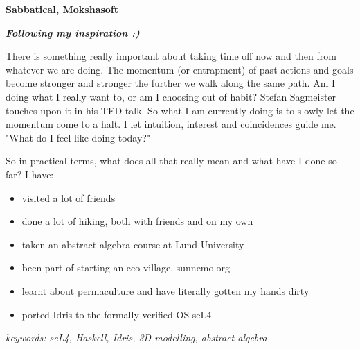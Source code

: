 \item[2016-] \textbf{Sabbatical, Mokshasoft}

\textit{\textbf{Following my inspiration :)}}

There is something really important about taking time off now and then from whatever we are doing. The momentum (or entrapment) of past actions and goals become stronger and stronger the further we walk along the same path. Am I doing what I really want to, or am I choosing out of habit? Stefan Sagmeister touches upon it in his TED talk. So what I am currently doing is to slowly let the momentum come to a halt. I let intuition, interest and coincidences guide me. "What do I feel like doing today?"

So in practical terms, what does all that really mean and what have I done so far? I have:

\begin{itemize}
    \item visited a lot of friends
    \item done a lot of hiking, both with friends and on my own
    \item taken an abstract algebra course at Lund University
    \item been part of starting an eco-village, sunnemo.org
    \item learnt about permaculture and have literally gotten my hands dirty
    \item ported Idris to the formally verified OS seL4
\end{itemize}

\textit{keywords: seL4, Haskell, Idris, 3D modelling, abstract algebra}
